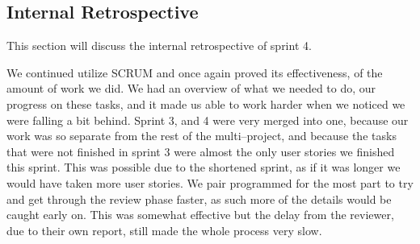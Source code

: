 \subsection*{Internal Retrospective}
This section will discuss the internal retrospective of sprint 4.

We continued utilize SCRUM and once again proved its effectiveness, of the amount of work we did.
We had an overview of what we needed to do, our progress on these tasks, and it made us able to work harder when we noticed we were falling a bit behind.
Sprint 3, and 4 were very merged into one, because our work was so separate from the rest of the multi--project, and because the tasks that were not finished in sprint 3 were almost the only user stories we finished this sprint.
This was possible due to the shortened sprint, as if it was longer we would have taken more user stories.
We pair programmed for the most part to try and get through the review phase faster, as such more of the details would be caught early on.
This was somewhat effective but the delay from the reviewer, due to their own report, still made the whole process very slow.
